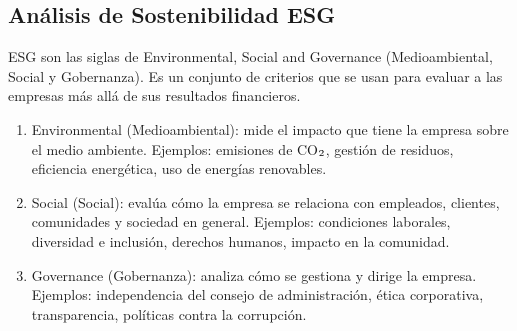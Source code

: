 \documentclass[letterpaper,10pt,spanish]{sphinxmanual}
\begin{document}
\subsection{Análisis de Sostenibilidad ESG}
\label{\detokenize{DatosPreparacion:analisis-de-sostenibilidad-esg}}
\sphinxAtStartPar
ESG son las siglas de Environmental, Social and Governance (Medioambiental, Social y Gobernanza). Es un conjunto de criterios que se usan para evaluar a las empresas más allá de sus resultados financieros.
\begin{enumerate}
%
\item {} 
\sphinxAtStartPar
Environmental (Medioambiental): mide el impacto que tiene la empresa sobre el medio ambiente. Ejemplos: emisiones de CO\(\sb{\text{2}}\), gestión de residuos, eficiencia energética, uso de energías renovables.

\item {} 
\sphinxAtStartPar
Social (Social): evalúa cómo la empresa se relaciona con empleados, clientes, comunidades y sociedad en general. Ejemplos: condiciones laborales, diversidad e inclusión, derechos humanos, impacto en la comunidad.

\item {} 
\sphinxAtStartPar
Governance (Gobernanza): analiza cómo se gestiona y dirige la empresa. Ejemplos: independencia del consejo de administración, ética corporativa, transparencia, políticas contra la corrupción.

\end{enumerate}
\end{document}
